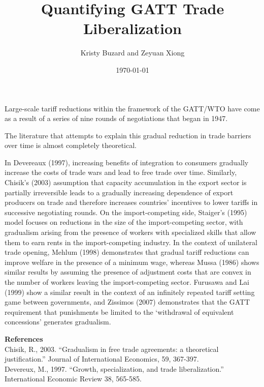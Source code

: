 \documentclass[12pt]{article}
\begin{document}
\title{\vskip-0.6in Quantifying GATT Trade Liberalization}
\author{Kristy Buzard and Zeyuan Xiong}
\date{\today}
\maketitle

Large-scale tariff reductions within the framework of the GATT/WTO have come as a result of a series of nine rounds of negotiations that began in 1947. 

The literature that attempts to explain this gradual reduction in trade barriers over time is almost completely theoretical. 

In Devereaux (1997), increasing benefits of integration to consumers gradually increase the costs of trade wars and lead to free trade over time. Similarly, Chisik's (2003) assumption that capacity accumulation in the export sector is partially irreversible leads to a gradually increasing dependence of export producers on trade and therefore increases countries' incentives to lower tariffs in successive negotiating rounds. On the import-competing side, Staiger's (1995) model focuses on reductions in the size of the import-competing sector, with gradualism arising from the presence of workers with specialized skills that allow them to earn rents in the import-competing industry. In the context of unilateral trade opening, Mehlum (1998) demonstrates that gradual tariff reductions can improve welfare in the presence of a minimum wage, whereas Mussa (1986) shows similar results by assuming the presence of adjustment costs that are convex in the number of workers leaving the import-competing sector. Furusawa and Lai (1999) show a similar result in the context of an infinitely repeated tariff setting game between governments, and Zissimos (2007) demonstrates that the GATT requirement that punishments be limited to the `withdrawal of equivalent concessions' generates gradualism.

				

\newpage
\noindent\large\textbf{References}\\

\noindent Chisik, R., 2003. ``Gradualism in free trade agreements: a theoretical justification.'' Journal of International Economics, 59, 367-397. \\

\noindent Devereux, M., 1997. ``Growth, specialization, and trade liberalization.'' International Economic Review
38, 565-585. \\
\end{document}
